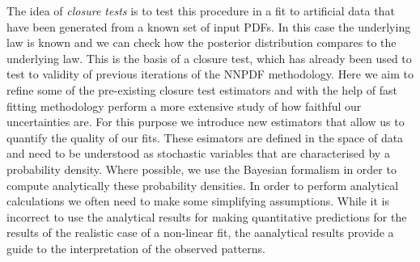 The idea of {\em closure tests} is to test this procedure in a fit to artificial
data that have been generated from a known set of input PDFs. In this case the
underlying law is known and we can check how the posterior distribution compares
to the underlying law. This is the basis of a closure test, which has already
been used to test to validity of previous iterations of the NNPDF methodology.
Here we aim to refine some of the pre-existing closure test estimators and with
the help of fast fitting methodology perform a more extensive study of how
faithful our uncertainties are. For this purpose we introduce new estimators
that allow us to quantify the quality of our fits. These esimators are defined
in the space of data and need to be understood as stochastic variables that are 
characterised by a probability density. Where possible, we use the Bayesian
formalism in order to compute analytically these probability densities. In order 
to perform analytical calculations we often need to make some simplifying 
assumptions. While it is incorrect to use the analytical results for making 
quantitative predictions for the results of the realistic case of a non-linear fit, 
the aanalytical results provide a guide to the interpretation of the observed 
patterns. 
 
